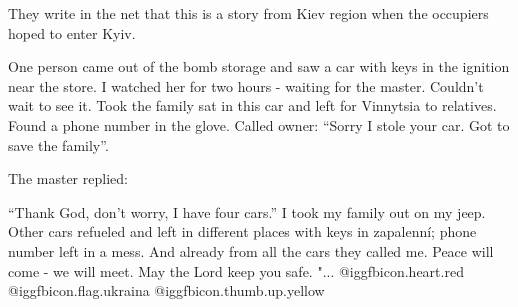  
 
 
 
 

They write in the net that this is a story from Kiev region when the occupiers
hoped to enter Kyiv.

One person came out of the bomb storage and saw a car with keys in the ignition
near the store. I watched her for two hours - waiting for the master. Couldn't
wait to see it. Took the family sat in this car and left for Vinnytsia to
relatives. Found a phone number in the glove. Called owner: \enquote{Sorry I
stole your car. Got to save the family}.

The master replied:

\enquote{Thank God, don't worry, I have four cars.} I took my family out on my
jeep.  Other cars refueled and left in different places with keys in zapalenní;
phone number left in a mess. And already from all the cars they called me.
Peace will come - we will meet. May the Lord keep you safe. "...
@igg{fbicon.heart.red} @igg{fbicon.flag.ukraina}  @igg{fbicon.thumb.up.yellow} 
